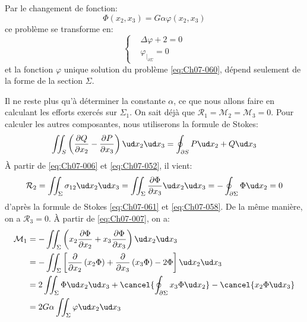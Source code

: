 Par le changement de fonction:
\begin{equation}
    \Phi \left( x_2, x_3 \right) = G \alpha \varphi \left( x_2, x_3 \right)
    \label{eq:Ch07-059}
\end{equation}
ce problème se transforme en:
\begin{equation}
    \left\{
    \begin{aligned}
        & \Delta \varphi + 2 = 0 \\
        & \varphi_{|_{\partial \Sigma}} = 0
    \end{aligned}
    \right.
    \label{eq:Ch07-060}
\end{equation}
et la fonction $\varphi$ unique solution du problème \eqref{eq:Ch07-060}, dépend seulement de la forme de la section $\Sigma$.

Il ne reste plus qu'à déterminer la constante $\alpha$, ce que nous allons faire en calculant les efforts exercés sur $\Sigma_1$.
On sait déjà que $\mathcal{R}_1 = \mathcal{M}_2 = \mathcal{M}_3 = 0$.
Pour calculer les autres composantes, nous utiliserons la formule de Stokes:
\begin{equation}
    \iint_{S} \left( \frac{\partial Q}{\partial x_2} - \frac{\partial P}{\partial x_3} \right) \ud x_2 \ud x_3 = \oint_{\partial S} P \ud x_2 + Q \ud x_3
    \label{eq:Ch07-061}
\end{equation}
À partir de \eqref{eq:Ch07-006} et \eqref{eq:Ch07-052}, il vient:
\begin{equation}
    \mathcal{R}_2 = \iint_{\Sigma} \sigma_{12} \ud x_2 \ud x_3 = \iint_{\Sigma} \frac{\partial \Phi}{\partial x_3} \ud x_2 \ud x_3 = - \oint_{\partial \Sigma} \Phi \ud x_2 = 0
    \label{eq:Ch07-062}
\end{equation}
d'après la formule de Stokes \eqref{eq:Ch07-061} et \eqref{eq:Ch07-058}.
De la même manière, on a $\mathcal{R}_3 = 0$.
À partir de \eqref{eq:Ch07-007}, on a:
\begin{equation}
    \begin{aligned}
        \mathcal{M}_1 &= -\iint_{\Sigma} \left( x_2 \frac{\partial \Phi}{\partial x_2} + x_3 \frac{\partial \Phi}{\partial x_3} \right) \ud x_2 \ud x_3 \\
        &= -\iint_{\Sigma} \left[ \frac{\partial}{\partial x_2} \left( x_2 \Phi \right) + \frac{\partial}{\partial x_3} \left( x_3 \Phi \right) - 2\Phi \right] \ud x_2 \ud x_3 \\
        &= 2 \iint_{\Sigma} \Phi \ud x_2 \ud x_3 + \cancel{\oint_{\partial \Sigma} x_3 \Phi \ud x_2} - \cancel{x_2 \Phi \ud x_3} \\
        &= 2 G \alpha \iint_{\Sigma} \varphi \ud x_2 \ud x_3
    \end{aligned}
    \label{eq:Ch07-063}
\end{equation}
